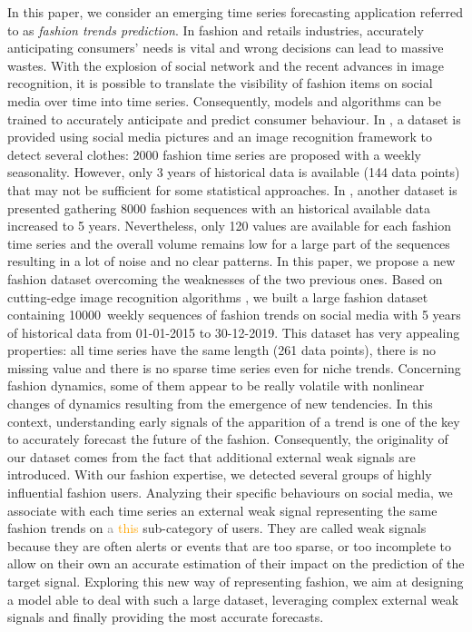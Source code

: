 \documentclass[10pt]{article} %
\newcommand{\numberts}{10000}
\begin{document}
In this paper, we consider an emerging time series forecasting application referred to as {\em fashion trends prediction}. In fashion and retails industries, accurately anticipating consumers' needs is vital and wrong decisions can lead to massive wastes. With the explosion of social network and the recent advances in image recognition, it is possible to translate the visibility of fashion items on social media over time into time series. Consequently, models and algorithms can be trained to accurately anticipate and predict consumer behaviour. In \citet{ma2020}, a  dataset is provided using social media pictures and an image recognition framework to detect several clothes: 2000 fashion time series are proposed with a weekly seasonality. However, only 3 years of historical data is available (144 data points) that may not be sufficient for some statistical approaches. In \citet{ma2020}, another dataset is presented gathering 8000 fashion sequences with an historical available data  increased to 5 years. Nevertheless, only 120 values are available for each fashion time series and the overall volume remains low for a large part of the sequences resulting in a lot of noise and no clear patterns. In this paper, we propose a new fashion dataset overcoming the weaknesses of the two previous ones. Based on cutting-edge image recognition algorithms \citep{ren2015,chollet2017}, we built a large fashion dataset containing \numberts\ weekly sequences of fashion trends on social media with 5 years of historical data from 01-01-2015 to 30-12-2019. This dataset has very appealing properties:  all time series have the same length (261 data points), there is no missing value and there is no sparse time series even for niche trends. Concerning fashion dynamics, some of them appear to be really volatile with nonlinear changes of dynamics resulting from the emergence of new tendencies. In this context, understanding early signals of the apparition of a trend is one of the key to accurately forecast the future of the fashion. Consequently, the originality of our dataset comes from the fact that additional external weak signals are introduced. With our fashion expertise, we detected several groups of highly influential fashion users. Analyzing their specific behaviours on social media, we associate with each time series an external weak signal representing the same fashion trends on \textcolor{gray}{a} \textcolor{orange}{this} sub-category of users. They are called weak signals because they are often alerts or events that are too sparse, or too incomplete to allow on their own an accurate estimation of their impact on the prediction of the target signal. Exploring this new way of representing fashion, we aim at designing a model able to deal with such a large dataset, leveraging  complex external weak signals and finally providing the most accurate forecasts.
 
\end{document}
